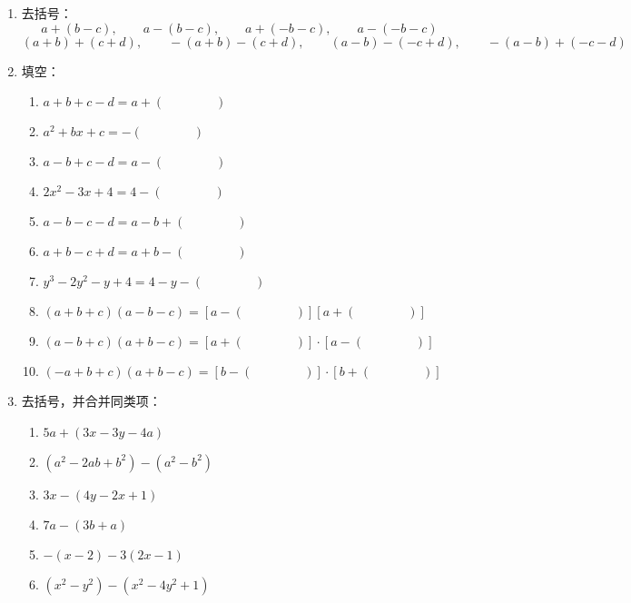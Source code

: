 \begin{enumerate}
\item  去括号：
\[a+(b-c),\qquad a-(b-c),\qquad a+(-b-c),\qquad a-(-b-c) \]
\[(a+b)+(c+d),\qquad -(a+b)-(c+d),\qquad (a-b)-(-c+d),\qquad -(a-b)+(-c-d) \]

\item 填空：
\begin{enumerate}
    \item $a+b+c-d=a+(\qquad\qquad)$
    \item $a^2+bx+c=-(\qquad\qquad)$
    \item $a-b+c-d=a-(\qquad\qquad)$
    \item $2x^2-3x+4=4-(\qquad\qquad)$

    \item  $a-b-c-d=a-b+(\qquad\qquad)$
    \item $a+b-c+d=a+b-(\qquad\qquad)$
    \item $y^{3}-2 y^{2}-y+4=4-y-(\qquad\qquad)$
    \item $(a+b+c)(a-b-c)=[a-(\qquad\qquad)][a+(\qquad\qquad)]$
    \item $(a-b+c)(a+b-c)=[a+(\qquad\qquad )]\cdot [a-(\qquad\qquad)]$
    \item $(-a+b+c)(a+b-c)=[b-(\qquad\qquad)] \cdot[b+(\qquad\qquad)]$
 
\end{enumerate}

\item 去括号，并合并同类项：
   \begin{multicols}{2}
\begin{enumerate}
    \item  $5 a+(3 x-3 y-4 a)$
    \item   $\left(a^{2}-2 a b+b^{2}\right)-\left(a^{2}-b^{2}\right)$
    \item  $3 x-(4 y-2 x+1) $
    \item   $7 a-(3 b+a)$
    \item  $-(x-2)-3(2 x-1)$
    \item  $\left(x^{2}-y^{2}\right)-\left(x^{2}-4 y^{2}+1\right)$
     
\end{enumerate}
    \end{multicols}


\end{enumerate}
